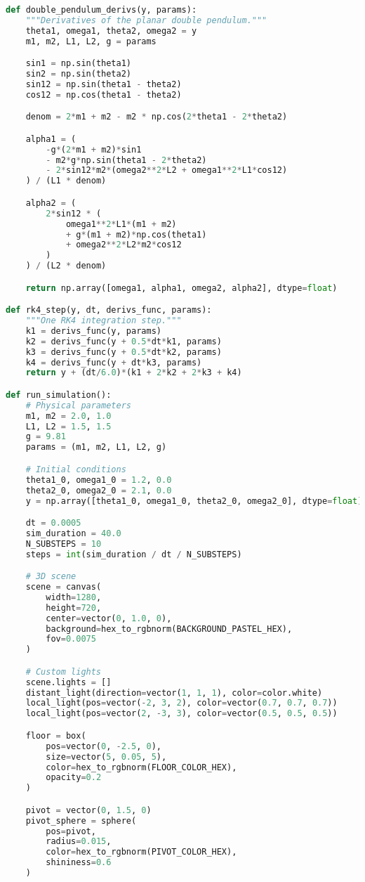 \documentclass[letterpaper,12pt]{article}
\begin{document}
\begin{enumerate}[leftmargin=*, itemsep=1em]
\begin{lstlisting}[language=Python, caption=Double Pendulum Simulation (double\_pendulum.py), label=lst:doublependulum]
def double_pendulum_derivs(y, params):
    """Derivatives of the planar double pendulum."""
    theta1, omega1, theta2, omega2 = y
    m1, m2, L1, L2, g = params

    sin1 = np.sin(theta1)
    sin2 = np.sin(theta2)
    sin12 = np.sin(theta1 - theta2)
    cos12 = np.cos(theta1 - theta2)

    denom = 2*m1 + m2 - m2 * np.cos(2*theta1 - 2*theta2)

    alpha1 = (
        -g*(2*m1 + m2)*sin1
        - m2*g*np.sin(theta1 - 2*theta2)
        - 2*sin12*m2*(omega2**2*L2 + omega1**2*L1*cos12)
    ) / (L1 * denom)

    alpha2 = (
        2*sin12 * (
            omega1**2*L1*(m1 + m2)
            + g*(m1 + m2)*np.cos(theta1)
            + omega2**2*L2*m2*cos12
        )
    ) / (L2 * denom)

    return np.array([omega1, alpha1, omega2, alpha2], dtype=float)

def rk4_step(y, dt, derivs_func, params):
    """One RK4 integration step."""
    k1 = derivs_func(y, params)
    k2 = derivs_func(y + 0.5*dt*k1, params)
    k3 = derivs_func(y + 0.5*dt*k2, params)
    k4 = derivs_func(y + dt*k3, params)
    return y + (dt/6.0)*(k1 + 2*k2 + 2*k3 + k4)

def run_simulation():
    # Physical parameters
    m1, m2 = 2.0, 1.0
    L1, L2 = 1.5, 1.5
    g = 9.81
    params = (m1, m2, L1, L2, g)

    # Initial conditions
    theta1_0, omega1_0 = 1.2, 0.0
    theta2_0, omega2_0 = 2.1, 0.0
    y = np.array([theta1_0, omega1_0, theta2_0, omega2_0], dtype=float)

    dt = 0.0005
    sim_duration = 40.0
    N_SUBSTEPS = 10
    steps = int(sim_duration / dt / N_SUBSTEPS)

    # 3D scene
    scene = canvas(
        width=1280,
        height=720,
        center=vector(0, 1.0, 0),
        background=hex_to_rgbnorm(BACKGROUND_PASTEL_HEX),
        fov=0.0075
    )

    # Custom lights
    scene.lights = []
    distant_light(direction=vector(1, 1, 1), color=color.white)
    local_light(pos=vector(-2, 3, 2), color=vector(0.7, 0.7, 0.7))
    local_light(pos=vector(2, -3, 3), color=vector(0.5, 0.5, 0.5))

    floor = box(
        pos=vector(0, -2.5, 0),
        size=vector(5, 0.05, 5),
        color=hex_to_rgbnorm(FLOOR_COLOR_HEX),
        opacity=0.2
    )

    pivot = vector(0, 1.5, 0)
    pivot_sphere = sphere(
        pos=pivot,
        radius=0.015,
        color=hex_to_rgbnorm(PIVOT_COLOR_HEX),
        shininess=0.6
    )


\end{lstlisting}
\end{enumerate}
\end{document}
